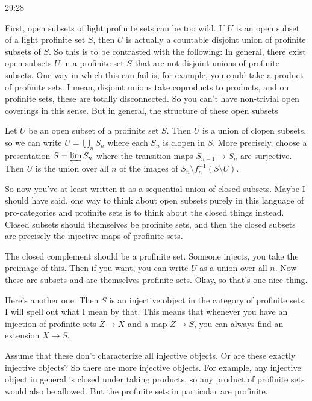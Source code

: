 \begin{example}
\begin{unfinished}{29:28}
\begin{remark}
\begin{proposition}
\end{proposition}
First, open subsets of light profinite sets can be too wild. If $U$ is an open subset of a light profinite set $S$, then $U$ is actually a countable disjoint union of profinite subsets of $S$. So this is to be contrasted with the following: In general, there exist open subsets $U$ in a profinite set $S$ that are not disjoint unions of profinite subsets. One way in which this can fail is, for example, you could take a product of profinite sets. I mean, disjoint unions take coproducts to products, and on profinite sets, these are totally disconnected. So you can't have non-trivial open coverings in this sense. But in general, the structure of these open subsets

Let $U$ be an open subset of a profinite set $S$. Then $U$ is a union of clopen subsets, so we can write $U = \bigcup_{n} S_n$ where each $S_n$ is clopen in $S$. More precisely, choose a presentation $S = \varprojlim S_n$ where the transition maps $S_{n+1} \to S_n$ are surjective. Then $U$ is the union over all $n$ of the images of $S_n \setminus f_n^{-1}(S \setminus U)$.

So now you've at least written it as a sequential union of closed subsets. Maybe I should have said, one way to think about open subsets purely in this language of pro-categories and profinite sets is to think about the closed things instead. Closed subsets should themselves be profinite sets, and then the closed subsets are precisely the injective maps of profinite sets.

The closed complement should be a profinite set. Someone injects, you take the preimage of this. Then if you want, you can write $U$ as a union over all $n$. Now these are subsets and are themselves profinite sets. Okay, so that's one nice thing.

Here's another one. Then $S$ is an injective object in the category of profinite sets. I will spell out what I mean by that. This means that whenever you have an injection of profinite sets $Z \to X$ and a map $Z \to S$, you can always find an extension $X \to S$.

Assume that these don't characterize all injective objects. Or are these exactly injective objects? So there are more injective objects. For example, any injective object in general is closed under taking products, so any product of profinite sets would also be allowed. But the profinite sets in particular are profinite.


\end{remark}
\end{unfinished}
\end{example}

